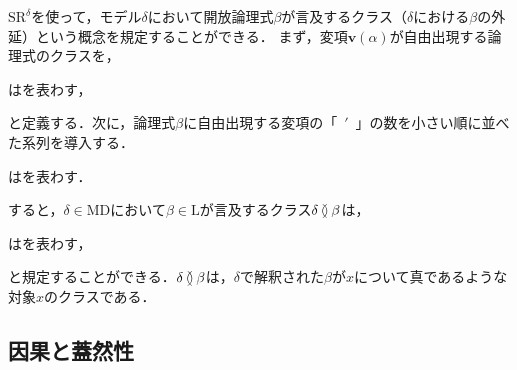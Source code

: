 $\mathrm{SR}^\delta$を使って，モデル$\delta$において開放論理式$\beta$が言及するクラス（$\delta$における$\beta$の外延）という概念を規定することができる．
まず，変項$ \boldsymbol{v}(\alpha) $が自由出現する論理式のクラスを，
\begin{df}
\label{df:開放論理式のクラス}
はを表わす，
\end{df}
\noindent と定義する．次に，論理式$ \beta $に自由出現する変項の「~$'$~」の数を小さい順に並べた系列を導入する．

\begin{df}
\label{df:変項列}
はを表わす．
\end{df}

\noindent すると，$\delta\in\mathrm{MD}$において$\beta\in\mathrm{L}$が言及するクラス$\delta\exten\beta$は，

\begin{df}
\label{df:}
\kagi{$
    \delta\exten\beta
$}はを表わす，
\end{df}

\noindent と規定することができる．$\delta\exten\beta$は，$\delta$で解釈された$\beta$が$x$について真であるような対象$x$のクラスである．

\subsection{因果と蓋然性}
\label{ssec:因果と蓋然性}

